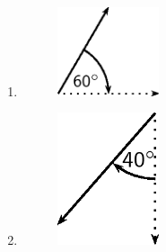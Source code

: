 \begin{enumerate}[noitemsep, label=\textbf{\arabic*}. ]
\begin{enumerate}[noitemsep, label=\textbf{\alph*}. ]
\begin{figure}[H]
\begin{center}
      \vspace{2pt}
    \vspace{.1in}
    
    \end{center}

 \end{figure}   

    \addtocounter{footnote}{-0}
    \label{m38812*uid16}\item 
    \setcounter{subfigure}{0}


	\begin{figure}[H] %
    \begin{center}
    \label{m38812*id187668!!!underscore!!!media}\label{m38812*id187668!!!underscore!!!printimage}\includegraphics[width=3cm]{col11305.imgs/m38812_PG11C1_008.png} %
        
      \vspace{2pt}
    \vspace{.1in}
    
    \end{center}

 \end{figure}   

    \addtocounter{footnote}{-0}
    \label{m38812*uid17}\item 
    \setcounter{subfigure}{0}


	\begin{figure}[H] %
    \begin{center}
    \label{m38812*id187683!!!underscore!!!media}\label{m38812*id187683!!!underscore!!!printimage}\includegraphics[width=3cm]{col11305.imgs/m38812_PG11C1_009.png} %
        
      \vspace{2pt}
    \vspace{.1in}
    
    \end{center}

 \end{figure}   

    \addtocounter{footnote}{-0}
    \end{enumerate}
                \end{enumerate}
        
